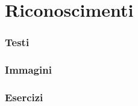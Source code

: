 \section*{Riconoscimenti}

\subsubsection*{Testi}


\subsubsection*{Immagini}

\subsubsection*{Esercizi}